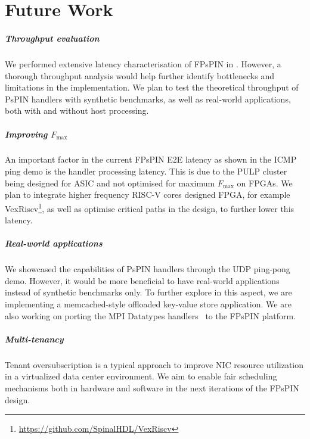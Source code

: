 \chapter{Future Work}

\paragraph{Throughput evaluation} We performed extensive latency characterisation of FPsPIN in .  However, a thorough throughput analysis would help further identify bottlenecks and limitations in the implementation.  We plan to test the theoretical throughput of PsPIN handlers with synthetic benchmarks, as well as real-world applications, both with and without host processing.

\paragraph{Improving $F_{\text{max}}$} An important factor in the current FPsPIN E2E latency as shown in the ICMP ping demo is the handler processing latency.  This is due to the PULP cluster being designed for ASIC and not optimised for maximum $F_{\text{max}}$ on FPGAs.  We plan to integrate higher frequency RISC-V cores designed FPGA, for example VexRiscv\footnote{\url{https://github.com/SpinalHDL/VexRiscv}}, as well as optimise critical paths in the design, to further lower this latency.

\paragraph{Real-world applications} We showcased the capabilities of PsPIN handlers through the UDP ping-pong demo.  However, it would be more beneficial to have real-world applications instead of synthetic benchmarks only.  To further explore in this aspect, we are implementing a memcached-style offloaded key-value store application.  We are also working on porting the MPI Datatypes handlers~\cite{Di_Girolamo_2019} to the FPsPIN platform.

\paragraph{Multi-tenancy} Tenant oversubscription is a typical approach to improve NIC resource utilization in a virtualized data center environment. We aim to enable fair scheduling mechanisms both in hardware and software in the next iterations of the FPsPIN design.
